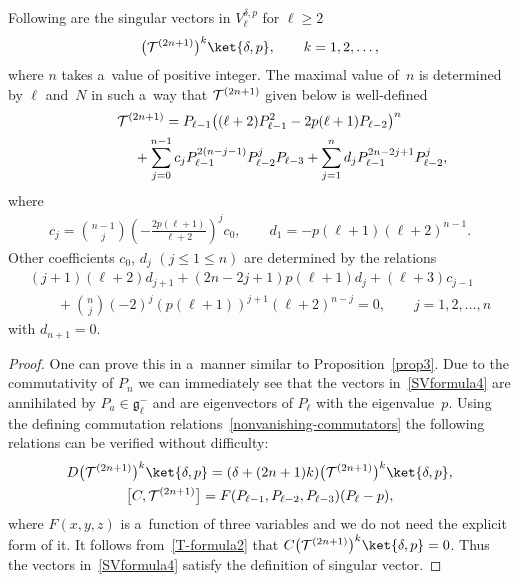 \documentclass[pdftex]{sigma}
\numberwithin{equation}{section}
\begin{document}
\begin{proposition}
\label{prop4}
Following are the singular vectors in $V^{\delta,p}_{\ell}$ for $ \ell \geq 2$
\begin{gather}
\big({\cal T}^{(2n+1)}\big)^k \ket{\delta,p},
\qquad
k = 1, 2, \dots,
\label{SVformula4}
\end{gather}
where $ n $ takes a~value of positive integer.
The maximal value of~$n$ is determined by $ \ell $ and~$N$ in such a~way that $ {\cal T}^{(2n+1)} $ given below is
well-defined
\begin{gather}
    {\cal T}^{(2n+1)} = P_{\ell-1}  \big((\ell+2)  P_{\ell-1}^2 - 2p  (\ell+1)  P_{\ell-2}\big)^n
\nonumber
\\
\hphantom{{\cal T}^{(2n+1)} =}{}
+ \sum\limits_{j=0}^{n-1} c_j  P_{\ell-1}^{2(n-j-1)}  P_{\ell-2}^j  P_{\ell-3} + \sum\limits_{j=1}^n d_j
P_{\ell-1}^{2n-2j+1}  P_{\ell-2}^j,
\label{SVformula5}
\end{gather}
where
\begin{gather*}
c_j = \binom{n-1}{j}  \left(- \frac{2p(\ell+1)}{\ell+2} \right)^j  c_0,
\qquad
d_1 = -p(\ell+1)  (\ell+2)^{n-1}.
\end{gather*}
Other coefficients $ c_0$,
$d_j$ $(j \leq 1 \leq n) $ are determined by the relations
\begin{gather*}
    (j+1)  (\ell+2)  d_{j+1} + (2n-2j+1)  p  (\ell+1) d_j + (\ell+3)  c_{j-1}
\nonumber
\\
\qquad{}
+ \binom{n}{j} (-2)^j  (p(\ell+1))^{j+1}  (\ell+2)^{n-j} = 0,
\qquad
j = 1, 2, \dots, n
\end{gather*}
with $d_{n+1} = 0$.
\end{proposition}


\begin{proof}
One can prove this in a~manner similar to Proposition~\ref{prop3}.
Due to the commutativity of $P_{n} $ we can immediately see that the vectors in~\eqref{SVformula4} are annihilated by $
P_a \in {\mathfrak g}_{\ell}^- $ and are eigenvectors of $ P_{\ell} $ with the eigenvalue~$p$.
Using the def\/ining commutation relations~\eqref{nonvanishing-commutators} the following relations can be verif\/ied
without dif\/f\/iculty:
\begin{gather}
    D \big({\cal T}^{(2n+1)}\big)^k \ket{\delta,p} = (\delta + (2n+1)k) \big({\cal T}^{(2n+1)}\big)^k  \ket{\delta,p},
\\
    \big[C, {\cal T}^{(2n+1)}\big] = F(P_{\ell-1},P_{\ell-2},P_{\ell-3})  (P_{\ell}-p),
\label{T-formula2}
\end{gather}
where $ F(x,y,z) $ is a~function of three variables and we do not need the explicit form of it.
It follows from~\eqref{T-formula2} that $ C \big({\cal T}^{(2n+1)}\big)^k \ket{\delta,p} = 0$.
Thus the vectors in~\eqref{SVformula4} satisfy the def\/inition of singular vector.
\end{proof}
\end{document}
